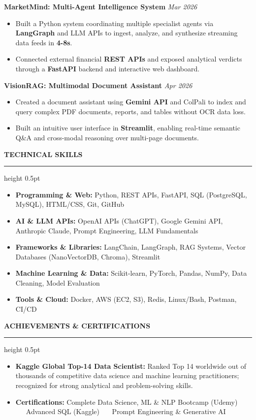 \documentclass[10pt,letterpaper]{article}
\newcommand{\resumesection}[1]{%
  \vspace{4pt}%
  {\fontsize{10.5pt}{12pt}\selectfont\textbf{\MakeUppercase{#1}}}%
  \vspace{1.5pt}%
  \hrule height 0.5pt%
  \vspace{3pt}%
}
\begin{document}
\vspace{2pt}
\noindent\textbf{MarketMind: Multi-Agent Intelligence System} \hfill \textit{Mar 2026}
\begin{itemize}
  \item Built a Python system coordinating multiple specialist agents via \textbf{LangGraph} and LLM APIs to ingest, analyze, and synthesize streaming data feeds in \textbf{4-8s}.
  \item Connected external financial \textbf{REST APIs} and exposed analytical verdicts through a \textbf{FastAPI} backend and interactive web dashboard.
\end{itemize}

\vspace{2pt}
\noindent\textbf{VisionRAG: Multimodal Document Assistant} \hfill \textit{Apr 2026}
\begin{itemize}
  \item Created a document assistant using \textbf{Gemini API} and ColPali to index and query complex PDF documents, reports, and tables without OCR data loss.
  \item Built an intuitive user interface in \textbf{Streamlit}, enabling real-time semantic Q\&A and cross-modal reasoning over multi-page documents.
\end{itemize}

\resumesection{Technical Skills}
\begin{itemize}[leftmargin=0pt, label={}]
  \item \textbf{Programming \& Web:} Python, REST APIs, FastAPI, SQL (PostgreSQL, MySQL), HTML/CSS, Git, GitHub
  \item \textbf{AI \& LLM APIs:} OpenAI APIs (ChatGPT), Google Gemini API, Anthropic Claude, Prompt Engineering, LLM Fundamentals
  \item \textbf{Frameworks \& Libraries:} LangChain, LangGraph, RAG Systems, Vector Databases (NanoVectorDB, Chroma), Streamlit
  \item \textbf{Machine Learning \& Data:} Scikit-learn, PyTorch, Pandas, NumPy, Data Cleaning, Model Evaluation
  \item \textbf{Tools \& Cloud:} Docker, AWS (EC2, S3), Redis, Linux/Bash, Postman, CI/CD
\end{itemize}

\resumesection{Achievements \& Certifications}
\begin{itemize}
  \item \textbf{Kaggle Global Top-14 Data Scientist:} Ranked Top 14 worldwide out of thousands of competitive data science and machine learning practitioners; recognized for strong analytical and problem-solving skills.
  \item \textbf{Certifications:} Complete Data Science, ML \& NLP Bootcamp (Udemy) \ \textbar\ \ Advanced SQL (Kaggle) \ \textbar\ \ Prompt Engineering \& Generative AI
\end{itemize}
\end{document}

